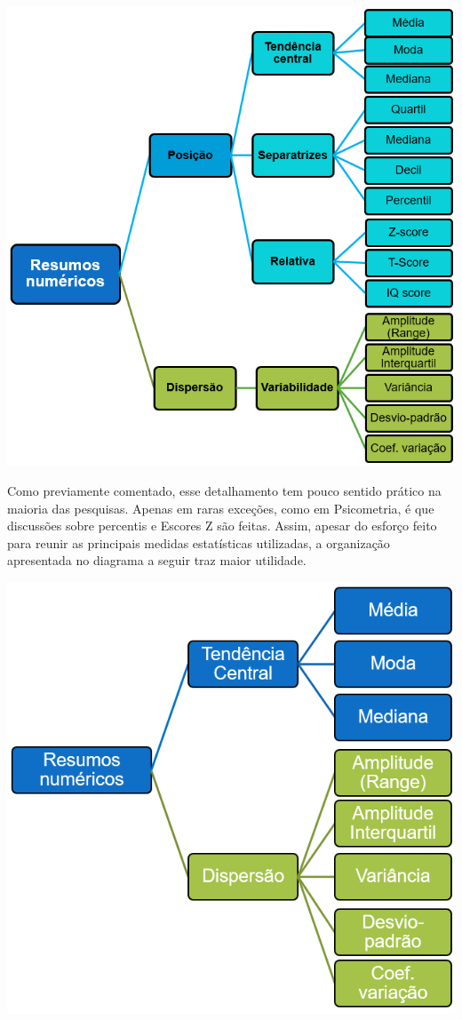 \documentclass[
]{book}
\begin{document}
\includegraphics{./img/cap_desc_medidas_posicao_dispersao.png}

Como previamente comentado, esse detalhamento tem pouco sentido prático na maioria das pesquisas. Apenas em raras exceções, como em Psicometria, é que discussões sobre percentis e Escores Z são feitas. Assim, apesar do esforço feito para reunir as principais medidas estatísticas utilizadas, a organização apresentada no diagrama a seguir traz maior utilidade.

\includegraphics{./img/cap_desc_medidas_posicao_dispersao2.png}
\end{document}
